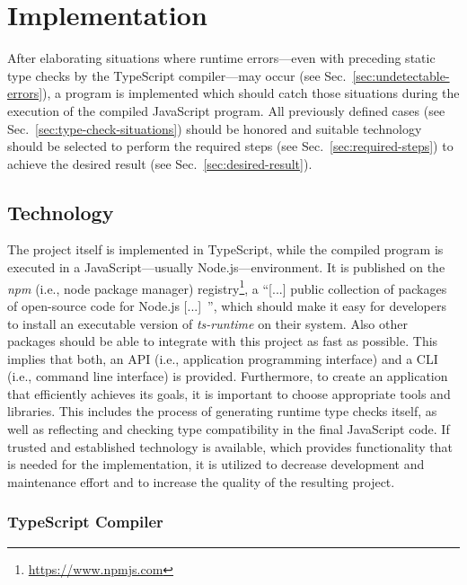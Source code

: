 \chapter{Implementation}
\label{cha:implementation}

After elaborating situations where runtime errors---even with preceding static type checks by the TypeScript compiler---may occur (see Sec.~\ref{sec:undetectable-errors}), a program is implemented which should catch those situations during the execution of the compiled JavaScript program. All previously defined cases (see Sec.~\ref{sec:type-check-situations}) should be honored and suitable technology should be selected to perform the required steps (see Sec.~\ref{sec:required-steps}) to achieve the desired result (see Sec.~\ref{sec:desired-result}).

\section{Technology}
\label{sec:technology}

The project itself is implemented in TypeScript, while the compiled program is executed in a JavaScript---usually Node.js---environment. It is published on the \emph{npm} (i.e., node package manager) registry\footnote{\url{https://www.npmjs.com}}, a ``[...] public collection of packages of open-source code for Node.js [...]~\cite{npmjs:about}'', which should make it easy for developers to install an executable version of \emph{ts-runtime} on their system. Also other packages should be able to integrate  with this project as fast as possible. This implies that both, an API (i.e., application programming interface) and a CLI (i.e., command line interface) is provided. Furthermore, to create an application that efficiently achieves its goals, it is important to choose appropriate tools and libraries. This includes the process of generating runtime type checks itself, as well as reflecting and checking type compatibility in the final JavaScript code. If trusted and established technology is available, which provides functionality that is needed for the implementation, it is utilized to decrease development and maintenance effort and to increase the quality of the resulting project.

\subsection{TypeScript Compiler}
\label{sec:typescript-compiler}

